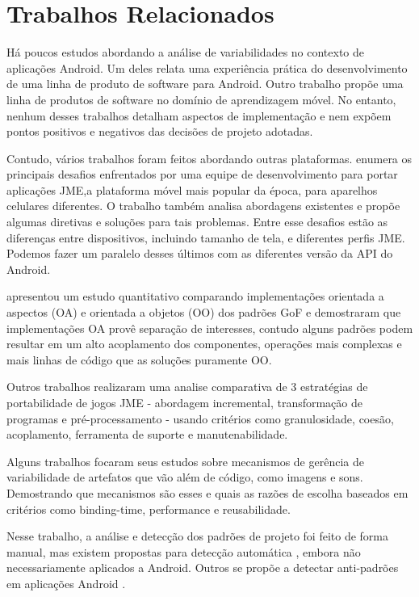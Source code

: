 
\chapter{Trabalhos Relacionados}

Há poucos estudos abordando a análise de variabilidades no contexto de aplicações 
Android. Um deles \cite{Pavlic2013} relata uma experiência prática do desenvolvimento
de uma linha de produto de software para Android. Outro trabalho \cite{FalvoJunior2015}
propõe uma linha de produtos de software no domínio de aprendizagem móvel. No entanto,
nenhum desses trabalhos detalham aspectos de implementação e nem expõem pontos
positivos e negativos das decisões de projeto adotadas.

Contudo, vários trabalhos foram feitos abordando outras plataformas.
 enumera os principais desafios enfrentados por uma equipe de
desenvolvimento para portar aplicações JME,a plataforma móvel mais popular da época,
para aparelhos celulares diferentes. O trabalho também analisa abordagens existentes
e propõe algumas diretivas e soluções para tais problemas. Entre esse desafios estão
as diferenças entre dispositivos, incluindo tamanho de tela, e diferentes perfis JME.
Podemos fazer um paralelo desses últimos com as diferentes versão da API do Android.

 apresentou um estudo quantitativo comparando implementações orientada a
aspectos (OA) e orientada a objetos (OO) dos padrões GoF e demostraram que implementações
OA provê separação de interesses, contudo alguns padrões podem resultar em um alto acoplamento
dos componentes, operações mais complexas e mais linhas de código que as soluções puramente OO.

Outros trabalhos realizaram uma analise comparativa de 3 estratégias de portabilidade
de jogos JME \cite{Alves2005Comparative} - abordagem incremental, transformação de
programas e pré-processamento - usando critérios como granulosidade, coesão, acoplamento,
ferramenta de suporte e manutenabilidade.

Alguns trabalhos \cite{Alves2006} focaram seus estudos sobre mecanismos de gerência
de variabilidade de artefatos que vão além de código, como imagens e sons. Demostrando
que mecanismos são esses e quais as razões de escolha baseados em critérios como
binding-time, performance e reusabilidade.

Nesse trabalho, a análise e detecção dos padrões de projeto foi feito de forma manual,
mas existem propostas para detecção automática \cite{Rasool2011}, embora não
necessariamente aplicados a Android. Outros se propõe a detectar anti-padrões em
aplicações Android \cite{Hecht2015}.

